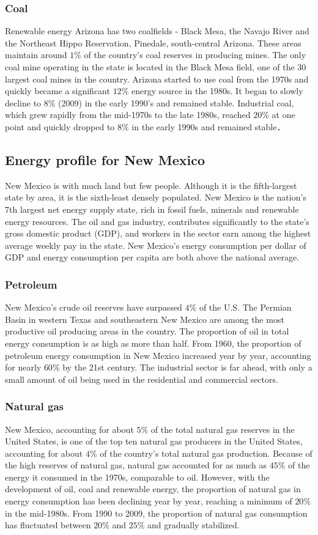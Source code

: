 \documentclass{mcmthesis}
\begin{document}
\subsubsection{Coal}
  Renewable energy Arizona has two coalfields - Black Mesa, the Navajo River and the Northeast Hippo Reservation, Pinedale, south-central Arizona.
  These areas maintain around $1\%$ of the country's coal reserves in producing mines. The only coal mine operating in the state is located in the Black
  Mesa field, one of the 30 largest coal mines in the country. Arizona started to use coal from the 1970s and quickly became a significant $12\%$ energy
  source in the 1980s. It began to slowly decline to $8\%$ (2009) in the early 1990's and remained stable. Industrial coal,
  which grew rapidly from the mid-1970s to the late 1980s, reached $20\%$ at one point and quickly dropped to $8\%$ in the early 1990s and remained stable．
\subsection{Energy profile for New Mexico}
New Mexico is with much land but few people. Although it is the fifth-largest state by area, it is the sixth-least densely populated.
New Mexico is the nation's 7th largest net energy supply state, rich in fossil fuels, minerals and renewable energy resources.
The oil and gas industry, contributes significantly to the state's gross domestic product (GDP),
and workers in the sector earn among the highest average weekly pay in the state.
New Mexico's energy consumption per dollar of GDP and energy consumption per capita are both above the national average.
\subsubsection{Petroleum}
  New Mexico's crude oil reserves have surpassed $4\%$ of the U.S. The Permian Basin in western Texas and southeastern New Mexico are among
  the most productive oil producing areas in the country. The proportion of oil in total energy consumption is as high as more than half.
  From 1960, the proportion of petroleum energy consumption in New Mexico increased year by year, accounting for nearly $60\%$ by the 21st century.
  The industrial sector is far ahead, with only a small amount of oil being used in the residential and commercial sectors.
\subsubsection{Natural gas}
  New Mexico, accounting for about $5\%$ of the total natural gas reserves in the United States, is one of the top ten natural gas
  producers in the United States, accounting for about $4\%$ of the country's total natural gas production. Because of the high reserves of
  natural gas, natural gas accounted for as much as $45\%$ of the energy it consumed in the 1970s, comparable to oil.
  However, with the development of oil, coal and renewable energy, the proportion of natural gas in energy consumption has been declining year by year,
  reaching a minimum of $20\%$ in the mid-1980s. From 1990 to 2009, the proportion of natural gas consumption has fluctuated between $20\%$ and $25\%$
   and gradually stabilized.
\end{document}
